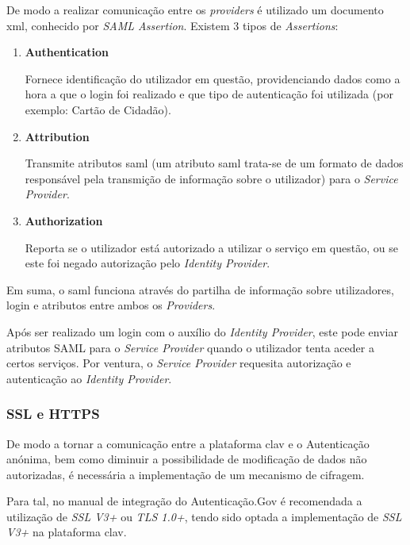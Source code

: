 De modo a realizar comunicação entre os \emph{providers} é utilizado um documento \gls{xml}, conhecido por \emph{SAML Assertion}. Existem 3 tipos de \emph{Assertions}:

\begin{enumerate}
    \item \textbf{Authentication} 
    
    Fornece identificação do utilizador em questão, providenciando dados como a hora a que o login foi realizado e que tipo de autenticação foi utilizada (por exemplo: Cartão de Cidadão).
    
    \item \textbf{Attribution}
    
    Transmite atributos \gls{saml} (um atributo \gls{saml} trata-se de um formato de dados responsável pela transmição de informação sobre o utilizador) para o \emph{Service Provider}.
    
    \item \textbf{Authorization}
    
    Reporta se o utilizador está autorizado a utilizar o serviço em questão, ou se este foi negado autorização pelo \emph{Identity Provider}.
\end{enumerate}

Em suma, o \gls{saml} funciona através do partilha de informação sobre utilizadores, login e atributos entre ambos os \emph{Providers}. 

Após ser realizado um login com o auxílio do \emph{Identity Provider}, este pode enviar atributos SAML para o \emph{Service Provider} quando o utilizador tenta aceder a certos serviços. Por ventura, o \emph{Service Provider} requesita autorização e autenticação ao \emph{Identity Provider}.

\cleardoublepage
\subsubsection{SSL e HTTPS} \label{ssl_section}

De modo a tornar a comunicação entre a plataforma \gls{clav} e o Autenticação anónima, bem como diminuir a possibilidade de modificação de dados não autorizadas, é necessária a implementação de um mecanismo de cifragem.

Para tal, no manual de integração do Autenticação.Gov é recomendada a utilização de \emph{SSL V3+} ou \emph{TLS 1.0+}\cite{manualAuthGov}, tendo sido optada a implementação de \emph{SSL V3+} na plataforma \gls{clav}.

